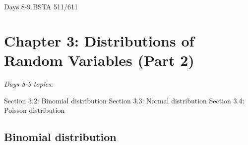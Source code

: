 \documentclass[12pt]{amsart}
\newtheorem{example}[theorem]{Example}
\begin{document}
\setcounter{section}{3}
\setcounter{subsection}{1}
Days 8-9 BSTA 511/611
{\huge  
\section*{Chapter 3: Distributions of Random Variables (Part 2)}
}



{\large 

\emph{Days 8-9 topics}:

Section 3.2: Binomial distribution  \newline
Section 3.3: Normal distribution  \newline
Section 3.4: Poisson distribution

\hrulefill

%
%
%
%
%
%





\subsection{Binomial distribution}

}
\end{document}

